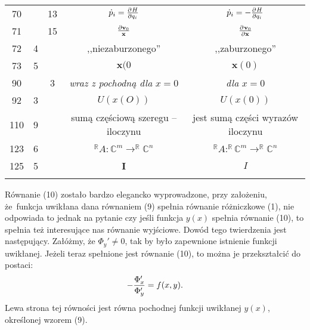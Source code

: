 \documentclass[a4paper,11pt]{article}
\begin{document}
\begin{center}
\begin{tabular}{|c|c|c|c|c|}
    70 & & 13 & $\dot{ p }_{ i } = \frac{ \partial^{  } {  H  } }{ \partial {  q_{ i }  }^{  } }$ & $\dot{ p }_{ i } = -\frac{ \partial^{  } {  H  } }{ \partial {  q_{ i }  }^{  } }$ \\
    71 & & 15 & $\frac{ \partial \bold{ v }_{ 0 } }{ \bold{ x } }$ & $\frac{ \partial^{  } {  \bold{ v }_{ 0 }  } }{ \partial {  \bold{ x }  }^{  } }$ \\
    72 & 4 & & ,,niezaburzonego'' & ,,zaburzonego'' \\
    73 & 5 & & $\mathbf{x}( 0$ & $\mathbf{x}( 0 )$ \\
    90 & & 3 & \emph{wraz z pochodną dla} $x = 0$ & \emph{dla} $x = 0$ \\
    92 & 3 & & $U( x( O ) )$ & $U( x( 0 ) )$ \\
    110 & 9 & & sumą częściową szeregu -- iloczynu & jest sumą części wyrazów iloczynu \\
    123 & 6 & & $^{ \mathbb{R} }A : \mathbb{C}^{ m } \rightarrow ^{ \mathbb{R} }\mathbb{C}^{ n }$ & $^{ \mathbb{R} }A : ^{ \mathbb{R} }\mathbb{C}^{ m } \rightarrow ^{ \mathbb{R} }\mathbb{C}^{ n }$ \\
    125 & 5 & & $\mathbf{I}$ & $I$ \\
    & & & & \\ \hline
  \end{tabular}
\end{center}








\start {} Równanie (10) zostało bardzo elegancko wyprowadzone,
przy założeniu, że~funkcja uwikłana dana równaniem (9) spełnia
równanie różniczkowe (1), nie odpowiada to jednak na pytanie czy jeśli
funkcja $y( x )$ spełnia równanie (10), to spełnia też interesujące
nas równanie wyjściowe. Dowód tego twierdzenia jest następujący.
Załóżmy, że $\Phi_{ y }' \neq 0$, tak by było zapewnione istnienie
funkcji uwikłanej. Jeżeli teraz spełnione jest równanie (10), to można
je przekształcić do postaci:
\begin{equation}
  -\frac{ \Phi_{ x }' }{ \Phi_{ y }' } = f( x, y ).
\end{equation}
Lewa strona tej równości jest równa pochodnej funkcji uwikłanej
$y( x )$, określonej wzorem (9). \\
\start {} \Dok \\
\start {} \Dok
\end{document}

